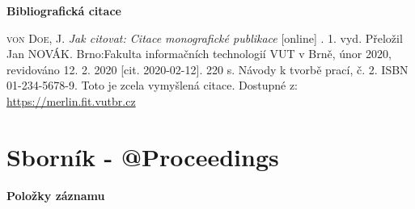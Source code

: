 \bigskip

\noindent \textbf{Bibliografická citace}

\medskip

\noindent \textsc{von Doe}, J. \textit{Jak citovat: Citace monografické publikace} [online] . 1. vyd. Přeložil Jan NOVÁK.
Brno:Fakulta informačních technologií VUT v Brně, únor 2020, revidováno 12. 2. 2020 [cit. 2020-02-12]. 220 s. Návody k tvorbě prací, č. 2. ISBN 01-234-5678-9. Toto je zcela vymyšlená citace. Dostupné z: \url{https://merlin.fit.vutbr.cz}
\newpage
\section*{Sborník - @Proceedings}
\label{pr-sbornik}
\noindent \textbf{Položky záznamu}

\medskip

